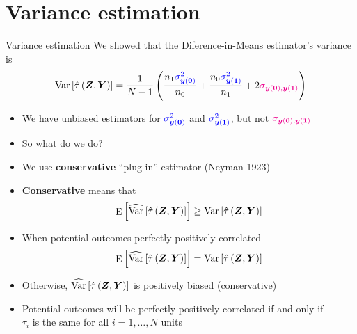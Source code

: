 \documentclass[table, xcolor = {dvipsnames}, 9pt]{beamer}
\theoremstyle{plain}
\newcommand{\bh}[1]{{\color{blue}{#1}}}
\newcommand{\mh}[1]{{\color{magenta}{#1}}}
\DeclareMathOperator{\E}{\rm{E}}
\DeclareMathOperator{\Var}{\rm{Var}}
\begin{document}
\section{Variance estimation}
\begin{frame}{Variance estimation}
We showed that the Diference-in-Means estimator's variance is \vspace{1em}
\begin{equation*}
\Var\left[\hat{\tau}\left(\bm{Z}, \bm{Y}\right)\right] = \frac{1}{N - 1}\left(\frac{n_1 \bh{\sigma^2_{\bm{y}(\bm{0})}}}{n_0} + \frac{n_0 \bh{\sigma^2_{\bm{y}(\bm{1})}}}{n_1} + 2\mh{\sigma_{\bm{y}(\bm{0}), \bm{y}(\bm{1})}}\right)
\end{equation*}
\begin{itemize}
\item We have unbiased estimators for $\bh{\sigma^2_{\bm{y}(\bm{0})}}$ and $\bh{\sigma^2_{\bm{y}(\bm{1})}}$, but not $\mh{\sigma_{\bm{y}(\bm{0}), \bm{y}(\bm{1})}}$
\item So what do we do? \pause
\item We use \textbf{conservative} ``plug-in'' estimator (Neyman 1923)
\item \textbf{Conservative} means that
\begin{equation*}
\E\left[\widehat{\Var}\left[\hat{\tau}\left(\bm{Z}, \bm{Y}\right)\right]\right] \geq \Var\left[\hat{\tau}\left(\bm{Z}, \bm{Y}\right)\right]
\end{equation*} \pause
\item When potential outcomes perfectly positively correlated
\begin{equation*}
\E\left[\widehat{\Var}\left[\hat{\tau}\left(\bm{Z}, \bm{Y}\right)\right]\right] = \Var\left[\hat{\tau}\left(\bm{Z}, \bm{Y}\right)\right]
\end{equation*}
\item Otherwise, $\widehat{\Var}\left[\hat{\tau}\left(\bm{Z}, \bm{Y}\right)\right]$ is positively biased (conservative) \pause
\item Potential outcomes will be perfectly positively correlated if and only if \\ $\tau_i$ is the same for all $i = 1, \ldots , N$ units
\end{itemize}
\end{frame}
\end{document}
